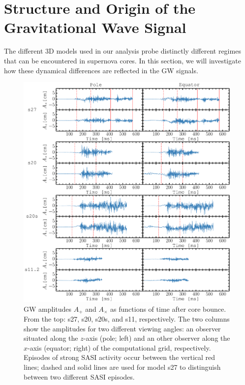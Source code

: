 \section{Structure and Origin of the Gravitational Wave Signal}
\label{sec:structure}
The different 3D models used in our analysis probe distinctly
different regimes that can be encountered in supernova cores.
In this section, we will investigate how these dynamical differences are reflected
in the GW signals.
\begin{figure}
\includegraphics[width=0.99\textwidth]{./images/chp1/fig1.pdf}
\caption{GW amplitudes $A_+$ and $A_\times$ as functions of time
  after core bounce.
  From the top: s27, s20, s20s, and s11, respectively. 
  The two columns show the amplitudes for two different viewing angles: an observer
  situated along the $z$-axis (pole; left) and an other observer along the $x$-axis (equator; right) of the computational grid, respectively.
  Episodes of strong SASI activity occur between the vertical red lines; dashed and solid lines are used for
  model s27 to distinguish between two different SASI episodes.
\label{fig:amps}}
\end{figure}

